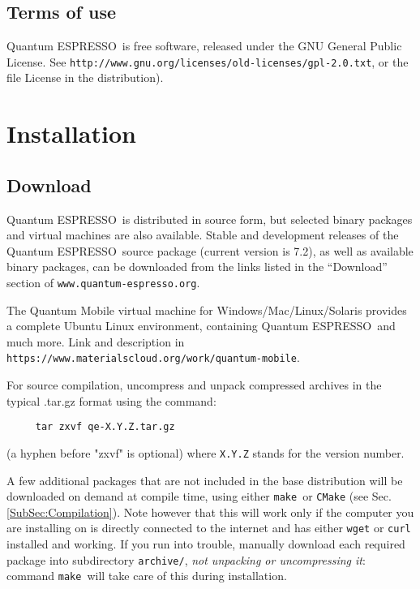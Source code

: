 \documentclass[12pt,a4paper]{article}
\def\version{7.2}
\def\qe{{\sc Quantum ESPRESSO}}
\def\make{\texttt{make}}
\begin{document}
\subsection{Terms of use}
\label{SubSec:Terms}

\qe\ is free software, released under the
GNU General Public License. See
\texttt{http://www.gnu.org/licenses/old-licenses/gpl-2.0.txt},
or the file License in the distribution).


\section{Installation}

\subsection{Download}
\label{SubSec:Download}

\qe\ is distributed in source form, but selected binary packages
and virtual machines are also available.
Stable and development releases of the \qe\ source package
(current version is \version), as well as available binary
packages, can be downloaded from the links listed in the
``Download'' section of \texttt{www.quantum-espresso.org}.

The Quantum Mobile virtual machine for Windows/Mac/Linux/Solaris
provides a complete Ubuntu Linux environment, containing \qe\ and
much more. Link and description in
\texttt{https://www.materialscloud.org/work/quantum-mobile}.

For source compilation, uncompress and unpack compressed archives
in the typical .tar.gz format using the command:
\begin{verbatim}
     tar zxvf qe-X.Y.Z.tar.gz
\end{verbatim}
(a hyphen before "zxvf" is optional) where \texttt{X.Y.Z} stands for the
version number.

A few additional packages that are not included in the base distribution
will be downloaded on demand at compile time, using either \make\ or
\texttt{CMake} (see Sec.\ref{SubSec:Compilation}).
Note however that this will work only if the computer you are
installing on is directly connected to the internet and has
either \texttt{wget} or \texttt{curl} installed and working.
If you run into trouble, manually download each required package
into subdirectory \texttt{archive/}, {\em not unpacking or
uncompressing it}:
command \make\ will take care of this during installation.
\end{document}
